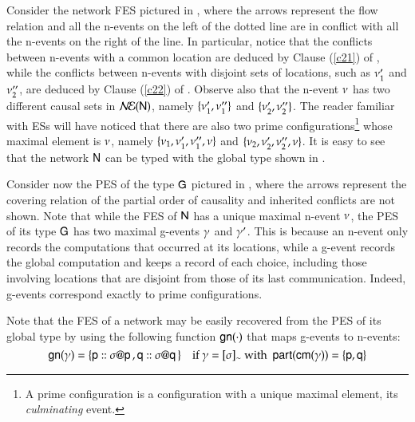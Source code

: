 Consider the network FES pictured in ,
where the arrows represent the flow relation and all the n-events on
the left of the dotted line are in conflict with all the n-events on
the right of the line. In particular, notice that the conflicts
between n-events with a common location are deduced by Clause
(\ref{c21}) of , while the conflicts
between n-events with disjoint sets of locations, such as $\nu'_1$
and $\nu''_2$, are deduced by Clause (\ref{c22}) of
. Observe also that the n-event $\nu$
has two different causal sets in $\mathcal{N\!E}({\sf N})$, namely $\{\nu'_1,
  \nu''_1\}$ and $\{\nu'_2, \nu''_2\}$. The reader familiar
with ESs will have noticed that there are also two prime
configurations\footnote{A prime configuration is a
  configuration with a unique maximal element, its \emph{culminating}
  event.} whose maximal element is $\nu$, namely
$\{\nu_1,\nu'_1, \nu''_1, \nu\}$ and
$\{\nu_2,\nu'_2, \nu''_2, \nu\}$.  It is easy to see
that the network ${\sf N}$ can be typed with the global type 
shown in . 

Consider now the PES of the type ${\sf G}$ pictured in
, where the arrows represent the covering
relation of the partial order of causality and inherited conflicts are
not shown.  Note that while the FES of ${\sf N}$ has a unique maximal
n-event $\nu$, the PES of its type ${\sf G}$ has two maximal g-events
$\gamma$ and $\gamma'$. This is because an n-event only records the
computations that occurred at its locations, while a g-event records
the global computation and keeps a record of each choice, including
those involving locations that are disjoint from those of its last
communication.  Indeed, g-events correspond exactly to prime
configurations.  

Note that the FES of a network may be easily recovered from the
PES of its global type by using the following function
${\sf gn}(\cdot)$ that maps g-events to n-events:
\[
{\sf gn}(\gamma) = \{{\sf p}:: \sigma @ {\sf p}\,,
  {\sf q}:: \sigma @ {\sf q}\,\} \quad \mbox{if }
\gamma = [\sigma]_{\sim}\mbox{ with}~~{\sf part}({\sf cm}(\gamma)) = \{{\sf p}, {\sf q}\}
\]

